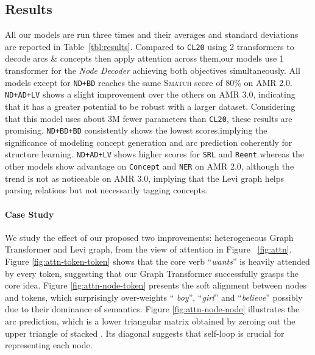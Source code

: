\documentclass[11pt,a4paper]{article}
\newcommand{\LN}{\linebreak\noindent}    \newcommand{\textsec}[1]{\textsection\ref{#1}}
\begin{document}
\subsection{Results}



All our models are run three times and their averages and standard deviations are reported in Table~\ref{tbl:results}.
Compared to \texttt{CL20} using 2 transformers to decode arcs \& concepts then apply attention across them,\LN our models use 1 transformer for the \textit{Node Decoder} achieving both objectives simultaneously.
All models except for \texttt{ND+BD} reaches the same \textsc{Smatch} score of 80\% on AMR 2.0.
\texttt{ND+AD+LV} shows a slight improvement over the others on AMR 3.0, indicating that it has a greater potential to be robust with a larger dataset.
Considering that this model uses about 3M fewer parameters than \texttt{CL20}, these results are promising.
\texttt{ND+BD+BD} consistently shows the lowest scores,\LN implying the significance of modeling concept generation and arc prediction coherently for structure learning.
\texttt{ND+AD+LV} shows higher scores for \texttt{SRL} and \texttt{Reent} whereas the other models show advantage on \texttt{Concept} and \texttt{NER} on AMR 2.0, although the trend is not as noticeable on AMR 3.0, implying that the Levi graph helps parsing relations but not necessarily tagging concepts.






\paragraph{Case Study} We study the effect of our proposed two improvements: heterogeneous Graph Transformer and Levi graph, from the view of attention in Figure ~\ref{fig:attn}. Figure \ref{fig:attn-token-token} shows that the core verb ``\textit{wants}'' is heavily attended by every token, suggesting that our Graph Transformer successfully grasps the core idea. Figure \ref{fig:attn-node-token} presents the soft alignment between nodes and tokens, which surprisingly over-weights ``\textit{ boy}'', ``\textit{girl}'' and ``\textit{believe}'' possibly due to their dominance of semantics. Figure \ref{fig:attn-node-node} illustrates the arc prediction, which is a lower triangular matrix obtained by zeroing out the upper triangle of stacked . Its diagonal suggests that self-loop is crucial for representing each node.
\end{document}
